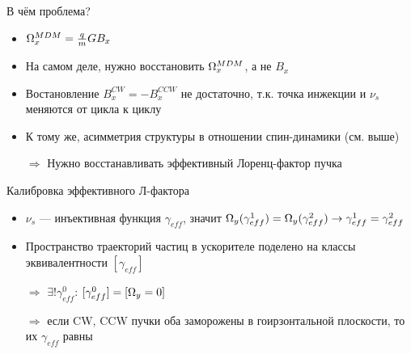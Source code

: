 \documentclass[14pt]{beamer}
\newcommand{\gef}{\gamma_{eff}}
\begin{document}
\begin{frame}{В чём проблема?}
	\begin{itemize}[<+->]
		\item $\Omega_x^{MDM} = \frac qmGB_x$
		\item На самом деле, нужно восстановить $\Omega_x^{MDM}$, а не $B_x$
		\item Востановление $B_x^{CW} = -B_x^{CCW}$ не достаточно, т.к. точка инжекции и $\nu_s$ меняются от цикла к циклу
		\item К тому же, асимметрия структуры в отношении спин-динамики (см. выше)
		\item[$\Rightarrow$] Нужно восстанавливать эффективный Лоренц-фактор пучка
	\end{itemize}
\end{frame}
\begin{frame}{Калибровка эффективного Л-фактора}
	\begin{itemize}[<+->]
		\item $\nu_s$ --- инъективная функция $\gef$, значит $\W_y(\gef^1) = \W_y(\gef^2) \to \gef^1=\gef^2$
		\item Пространство траекторий частиц в ускорителе поделено на классы эквивалентности $[\gef]$
		\item[$\Rightarrow$] $\exists!\gef^0$: $[\gef^0] = [\W_y=0]$
		\item[$\Rightarrow$] если CW, CCW пучки оба заморожены в гоирзонтальной плоскости, то их $\gef$ равны
	\end{itemize}
\end{frame}
\end{document}
